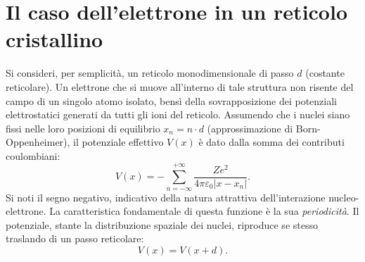\documentclass[a4paper,11pt]{report}
\begin{document}
\section{Il caso dell'elettrone in un reticolo cristallino}
Si consideri, per semplicità, un reticolo monodimensionale di passo $d$ (costante reticolare).
Un elettrone che si muove all'interno di tale struttura non risente del campo di un singolo atomo isolato, bensì della sovrapposizione dei potenziali elettrostatici generati da tutti gli ioni del reticolo.
Assumendo che i nuclei siano fissi nelle loro posizioni di equilibrio $x_n = n \cdot d$ (approssimazione di Born-Oppenheimer), il potenziale effettivo $V(x)$ è dato dalla somma dei contributi coulombiani:
\begin{equation}
    V(x) = -\sum_{n=-\infty}^{+\infty} \frac{Ze^2}{4\pi \varepsilon_0 |x - x_n|}.
\end{equation}
Si noti il segno negativo, indicativo della natura attrattiva dell'interazione nucleo-elettrone.
La caratteristica fondamentale di questa funzione è la sua \textit{periodicità}. Il potenziale, stante la distribuzione spaziale dei nuclei, riproduce se stesso traslando di un passo reticolare:
\begin{equation}
    V(x) = V(x+d).
\end{equation}
\end{document}
